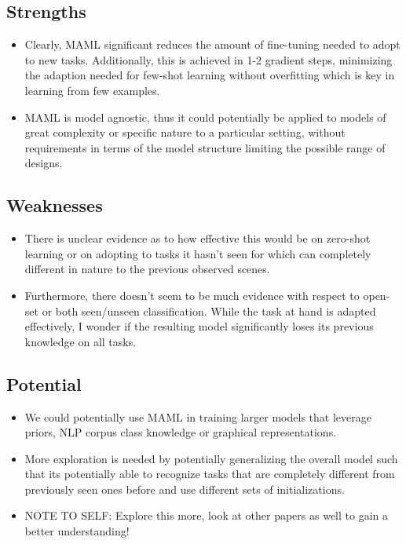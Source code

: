 \documentclass{article}
\begin{document}
\subsection{Strengths}
\begin{itemize}
    \item Clearly, MAML significant reduces the amount of fine-tuning needed to adopt to new tasks. Additionally, this is achieved in 1-2 gradient steps, minimizing the adaption needed for few-shot learning without overfitting which is key in learning from few examples.
    \item MAML is model agnostic, thus it could potentially be applied to models of great complexity or specific nature to a particular setting, without requirements in terms of the model structure limiting the possible range of designs.
\end{itemize}

\subsection{Weaknesses}
\begin{itemize}
    \item There is unclear evidence as to how effective this would be on zero-shot learning or on adopting to tasks it hasn't seen for which can completely different in nature to the previous observed scenes.
    \item Furthermore, there doesn't seem to be much evidence with respect to open-set or both seen/unseen classification. While the task at hand is adapted effectively, I wonder if the resulting model significantly loses its previous knowledge on all tasks.
\end{itemize}

\subsection{Potential}
\begin{itemize}
    \item We could potentially use MAML in training larger models that leverage priors, NLP corpus class knowledge or graphical representations.
    \item More exploration is needed by potentially generalizing the overall model such that its potentially able to recognize tasks that are completely different from previously seen ones before and use different sets of initializations.
    \item NOTE TO SELF: Explore this more, look at other papers as well to gain a better understanding!
\end{itemize}
\end{document}
